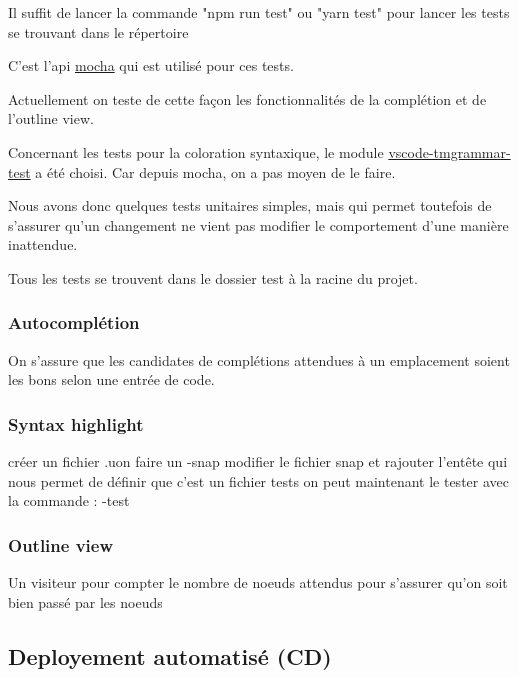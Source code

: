 \documentclass[
    iict, %
    il, %
]{heig-tb}
\begin{document}
Il suffit de lancer la commande "npm run test" ou "yarn test" pour lancer les tests se trouvant dans le répertoire %

C'est l'api \href{https://mochajs.org/api/}{mocha} qui est utilisé pour ces tests.

Actuellement on teste de cette façon les fonctionnalités de la complétion et de l'outline view.

Concernant les tests pour la coloration syntaxique, le module \href{https://github.com/PanAeon/vscode-tmgrammar-test}{vscode-tmgrammar-test} a été choisi.
Car depuis mocha, on a pas moyen de le faire.

Nous avons donc quelques tests unitaires simples, mais qui permet toutefois de s'assurer qu'un changement ne vient pas modifier le comportement d'une manière inattendue.

Tous les tests se trouvent dans le dossier test à la racine du projet. %

\subsubsection{Autocomplétion}
On s'assure que les candidates de complétions attendues à un emplacement soient les bons selon une entrée de code.

\subsubsection{Syntax highlight}
créer un fichier .uon
faire un -snap
modifier le fichier snap et rajouter l'entête qui nous permet de définir que c'est un fichier tests
on peut maintenant le tester avec la commande : -test


\subsubsection{Outline view}
Un visiteur pour compter le nombre de noeuds attendus pour s'assurer qu'on soit bien passé par les noeuds




\subsection{Deployement automatisé (CD)}
\end{document}
